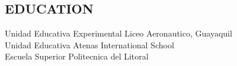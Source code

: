 \documentclass{res}
\begin{document}
 


\address{\bf  DOMICILIO ACTUAL\\Urbanizacion La Joya\\Guayquil, Ecuador\\(593) 42070702}
\address{\bf DOMICILIO PERMANENTE \\ Cdla. FAE Mz. 19 Villa 6 \\  Guayaquil, Ecuador\\  (593) 42397651}                                  
\begin{resume}
         
  
\section{EDUCATION}          
    Unidad Educativa Experimental Liceo Aeronautico, Guayaquil \\        
    Unidad Educativa Atenas International School   \\       
    Escuela Superior Politecnica del Litoral       \\ 
        
 
\end{resume}
\end{document}
